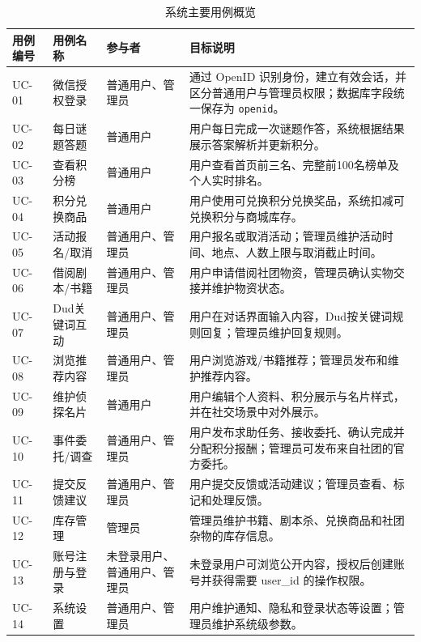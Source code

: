 \documentclass[a4paper,12pt]{article}
\begin{document}
{\small
\setlength{\tabcolsep}{3pt}
\begin{longtable}{>{\raggedright\arraybackslash}p{}>{\raggedright\arraybackslash}p{}>{\raggedright\arraybackslash}p{}>{\raggedright\arraybackslash}p{}}
    \caption{系统主要用例概览}
    \label{tab:use-case-summary}\\
    \toprule
    用例编号 & 用例名称 & 参与者 & 目标说明 \\
    \midrule
    UC-01 & 微信授权登录 & 普通用户、管理员 & 通过 OpenID 识别身份，建立有效会话，并区分普通用户与管理员权限；数据库字段统一保存为 \texttt{openid}。 \\
    UC-02 & 每日谜题答题 & 普通用户 & 用户每日完成一次谜题作答，系统根据结果展示答案解析并更新积分。 \\
    UC-03 & 查看积分榜 & 普通用户 & 用户查看首页前三名、完整前100名榜单及个人实时排名。 \\
    UC-04 & 积分兑换商品 & 普通用户 & 用户使用可兑换积分兑换奖品，系统扣减可兑换积分与商城库存。 \\
    UC-05 & 活动报名/取消 & 普通用户、管理员 & 用户报名或取消活动；管理员维护活动时间、地点、人数上限与取消截止时间。 \\
    UC-06 & 借阅剧本/书籍 & 普通用户、管理员 & 用户申请借阅社团物资，管理员确认实物交接并维护物资状态。 \\
    UC-07 & Dud关键词互动 & 普通用户、管理员 & 用户在对话界面输入内容，Dud按关键词规则回复；管理员维护回复规则。 \\
    UC-08 & 浏览推荐内容 & 普通用户、管理员 & 用户浏览游戏/书籍推荐；管理员发布和维护推荐内容。 \\
    UC-09 & 维护侦探名片 & 普通用户 & 用户编辑个人资料、积分展示与名片样式，并在社交场景中对外展示。 \\
    UC-10 & 事件委托/调查 & 普通用户、管理员 & 用户发布求助任务、接收委托、确认完成并分配积分报酬；管理员可发布来自社团的官方委托。 \\
    UC-11 & 提交反馈建议 & 普通用户、管理员 & 用户提交反馈或活动建议；管理员查看、标记和处理反馈。 \\
    UC-12 & 库存管理 & 管理员 & 管理员维护书籍、剧本杀、兑换商品和社团杂物的库存信息。 \\
    UC-13 & 账号注册与登录 & 未登录用户、普通用户、管理员 & 未登录用户可浏览公开内容，授权后创建账号并获得需要 user\_id 的操作权限。 \\
    UC-14 & 系统设置 & 普通用户、管理员 & 用户维护通知、隐私和登录状态等设置；管理员维护系统级参数。 \\
    \bottomrule
\end{longtable}
}
\end{document}
